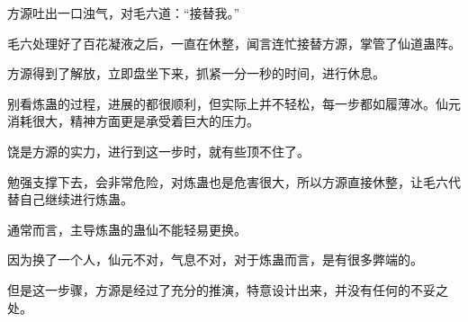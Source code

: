 \begin{this_body}
方源吐出一口浊气，对毛六道：“接替我。”

毛六处理好了百花凝液之后，一直在休整，闻言连忙接替方源，掌管了仙道蛊阵。

方源得到了解放，立即盘坐下来，抓紧一分一秒的时间，进行休息。

别看炼蛊的过程，进展的都很顺利，但实际上并不轻松，每一步都如履薄冰。仙元消耗很大，精神方面更是承受着巨大的压力。

饶是方源的实力，进行到这一步时，就有些顶不住了。

勉强支撑下去，会非常危险，对炼蛊也是危害很大，所以方源直接休整，让毛六代替自己继续进行炼蛊。

通常而言，主导炼蛊的蛊仙不能轻易更换。

因为换了一个人，仙元不对，气息不对，对于炼蛊而言，是有很多弊端的。

但是这一步骤，方源是经过了充分的推演，特意设计出来，并没有任何的不妥之处。

\end{this_body}

